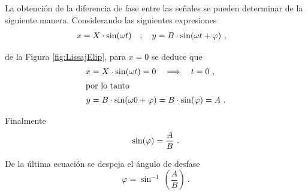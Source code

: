       \newpage
      La obtención de la diferencia de fase entre las señales se pueden determinar de la
      siguiente manera.
      Considerando las siguientes expresiones
      \begin{align}
         x &= X\cdot \sin(\omega t) \hspace{10pt} ; \hspace{10pt} y = B\cdot \sin(\omega t + \varphi) \ , \notag
      \end{align}
      
      \noindent de la Figura \ref{fig:LissajElip}, para $x = 0$ se deduce que
      \begin{align}
         x &= X\cdot \sin(\omega t) = 0 \hspace{10pt} \Longrightarrow \hspace{10pt} t = 0 ~ , \notag \\
         \intertext{por lo tanto}
         y &= B\cdot \sin(\omega 0 + \varphi) = B\cdot \sin(\varphi) = A ~ . \notag 
      \end{align}   

      \noindent Finalmente
      \begin{align}
         \sin(\varphi) = \dfrac{A}{B} ~ . \notag
      \end{align}
      
      \noindent De la última ecuación se despeja el ángulo de desfase
      \begin{equation}
         \boxed{\varphi = \sin^{-1}\ \left(\dfrac{A}{B} \right)}   \ . \label{eqn:AngDeDesf}   
      \end{equation}

